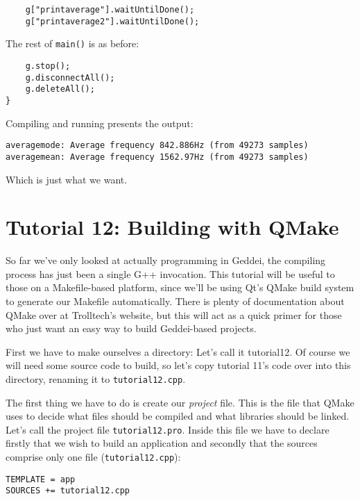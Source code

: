 \begin{verbatim}
    g["printaverage"].waitUntilDone();
    g["printaverage2"].waitUntilDone();
\end{verbatim}

The rest of \texttt{main()} is as before:

\begin{verbatim}
    g.stop();
    g.disconnectAll();
    g.deleteAll();
}
\end{verbatim}

Compiling and running presents the output:

\begin{verbatim}
averagemode: Average frequency 842.886Hz (from 49273 samples)
averagemean: Average frequency 1562.97Hz (from 49273 samples)
\end{verbatim}

Which is just what we want.




\section{Tutorial 12: Building with QMake}

So far we've only looked at actually programming in Geddei, the compiling process has just been a single G++ invocation. This tutorial will be useful to those on a Makefile-based platform, since we'll be using Qt's QMake build system to generate our Makefile automatically. There is plenty of documentation about QMake over at Trolltech's website\cite{web:trolltech}, but this will act as a quick primer for those who just want an easy way to build Geddei-based projects.

First we have to make ourselves a directory: Let's call it tutorial12. Of course we will need some source code to build, so let's copy tutorial 11's code over into this directory, renaming it to \texttt{tutorial12.cpp}.

The first thing we have to do is create our \textit{project} file. This is the file that QMake uses to decide what files should be compiled and what libraries should be linked. Let's call the project file \texttt{tutorial12.pro}. Inside this file we have to declare firstly that we wish to build an application and secondly that the sources comprise only one file (\texttt{tutorial12.cpp}):

\begin{verbatim}
TEMPLATE = app
SOURCES += tutorial12.cpp
\end{verbatim}

